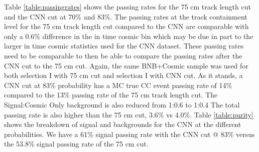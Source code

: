 \begin{table}[htp!]
\centering
{}
\caption{Signal and background event numbers of selection I and selection I with CNN cut estimated from a BNB+Cosmic sample and Cosmic only sample normalized to $5*10^{19}$ PoT. The last column gives the fraction of this signal or background type to the total selected events per CNN probability.} 
\label{table:purity} %
\end{table}

Table \ref{table:passingrates} shows the passing rates for the 75 cm track length cut and the CNN cut at 70\% and 83\%. The passing rates at the track containment level for the 75 cm track length cut compared to the CNN are comparable with only a 0.6\% difference in the in time cosmic bin which may be due in part to the larger in time cosmic statistics used for the CNN dataset. These passing rates need to be comparable to then be able to compare the passing rates after the CNN cut to the 75 cm cut. Again, the same BNB+Cosmic sample was used for both selection I with 75 cm cut and selection I with CNN cut. As it stands, a CNN cut at 83\% probability has a MC true CC event passing rate of 14\% compared to the 13\% passing rate of the 75 cm track length cut. The Signal:Cosmic Only background is also reduced from 1:0.6 to 1:0.4 The total passing rate is also higher than the 75 cm cut, 3.6\% vs 4.0\%. Table \ref{table:purity} shows the breakdown of signal and backgrounds for the CNN at the different probabilities. We have a 61\% signal passing rate with the CNN cut @ 83\% versus the 53.8\% signal passing rate of the 75 cm cut. 


